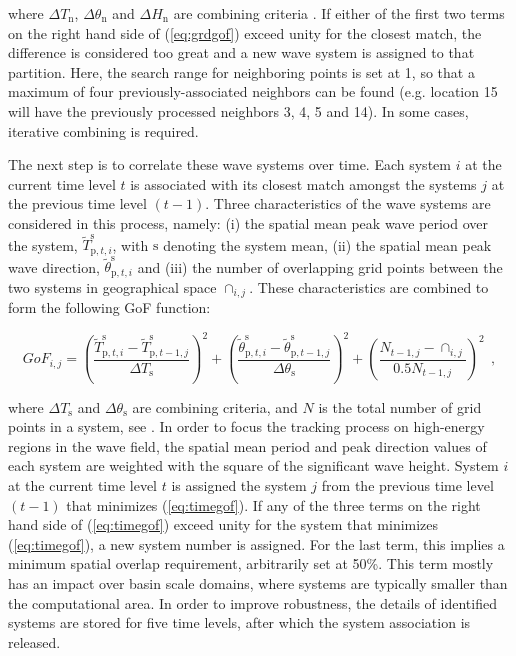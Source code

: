 \noindent
where $\Delta T_\mathrm{n}$, $\Delta\theta_\mathrm{n}$ and $\Delta
H_\mathrm{n}$ are combining criteria \citep{art:WHD13}. If either of the first
two terms on the right hand side of (\ref{eq:grdgof}) exceed unity for the
closest match, the difference is considered too great and a new wave system is
assigned to that partition. Here, the search range for neighboring points is
set at 1, so that a maximum of four previously-associated neighbors can be
found (e.g. location 15 will have the previously processed neighbors 3, 4, 5
and 14). In some cases, iterative combining is required.

The next step is to correlate these wave systems over time. Each system $i$ at
the current time level $t$ is associated with its closest match amongst the
systems $j$ at the previous time level $(t-1)$. Three characteristics of the
wave systems are considered in this process, namely: (i) the spatial mean peak
wave period over the system, $\tilde{T}^\mathrm{s}_{\mathrm{p},t,i}$, with
$\mathrm{s}$ denoting the system mean, (ii) the spatial mean peak wave
direction, $\tilde{\theta}^\mathrm{s}_{\mathrm{p},t,i}$ and (iii) the number
of overlapping grid points between the two systems in geographical space
$\cap_{i,j}$. These characteristics are combined to form the following
GoF function:

\begin{equation}
    GoF_{i,j} = {\left( \frac{\tilde{T}^\mathrm{s}_{\mathrm{p},t,i} - \tilde{T}^\mathrm{s}_{\mathrm{p},t-1,j}}{\Delta T_\mathrm{s}} \right)}^2 + 
                       {\left( \frac{\tilde{\theta}^\mathrm{s}_{\mathrm{p},t,i} - \tilde{\theta}^\mathrm{s}_{\mathrm{p},t-1,j}}{\Delta\theta_\mathrm{s}} \right)}^2 +
                       {\left( \frac{N_{t-1,j} - \cap_{i,j}}{0.5N_{t-1,j}} \right)}^2\ \ ,
\label{eq:timegof}
\end{equation} 

\noindent
where $\Delta T_\mathrm{s}$ and $\Delta\theta_\mathrm{s}$ are combining
criteria, and $N$ is the total number of grid points in a system, see
\cite{art:WHD13}. In order to focus the tracking process on high-energy
regions in the wave field, the spatial mean period and peak direction values
of each system are weighted with the square of the significant wave
height. System $i$ at the current time level $t$ is assigned the system $j$
from the previous time level $(t-1)$ that minimizes (\ref{eq:timegof}). If any
of the three terms on the right hand side of (\ref{eq:timegof}) exceed unity
for the system that minimizes (\ref{eq:timegof}), a new system number is
assigned. For the last term, this implies a minimum spatial overlap
requirement, arbitrarily set at 50\%. This term mostly has an impact over
basin scale domains, where systems are typically smaller than the
computational area. In order to improve robustness, the details of identified
systems are stored for five time levels, after which the system association is
released.



